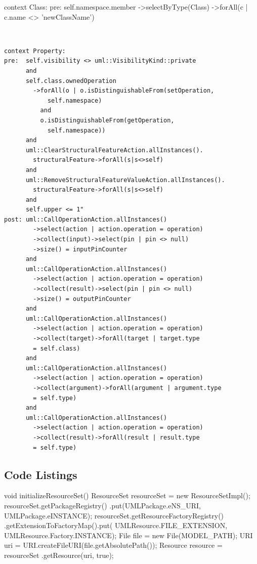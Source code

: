 \documentclass{llncs}
\begin{document}
\begin{lstsingle}[language=OCL,caption=OCL for \textit{rename class} refactoring,label=lst:renameclass]
context Class:
pre:  self.namespace.member
      ->selectByType(Class)
      ->forAll(c | c.name <> 'newClassName')
\end{lstsingle}
\\
\begin{lstlisting}[language=OCL,caption=OCL for \textit{encapsulate property} refactoring,label=lst:encapsulate]
context Property:
pre:  self.visibility <> uml::VisibilityKind::private 
      and 
      self.class.ownedOperation
        ->forAll(o | o.isDistinguishableFrom(setOperation, 
            self.namespace)
          and 
          o.isDistinguishableFrom(getOperation, 
            self.namespace)) 
      and 
      uml::ClearStructuralFeatureAction.allInstances().
        structuralFeature->forAll(s|s<>self)
      and
      uml::RemoveStructuralFeatureValueAction.allInstances().
        structuralFeature->forAll(s|s<>self)
      and
      self.upper <= 1"
post: uml::CallOperationAction.allInstances()
        ->select(action | action.operation = operation)
        ->collect(input)->select(pin | pin <> null)
        ->size() = inputPinCounter
      and
      uml::CallOperationAction.allInstances()
        ->select(action | action.operation = operation)
        ->collect(result)->select(pin | pin <> null)
        ->size() = outputPinCounter
      and
      uml::CallOperationAction.allInstances()
        ->select(action | action.operation = operation)
        ->collect(target)->forAll(target | target.type 
        = self.class)
      and 
      uml::CallOperationAction.allInstances()
        ->select(action | action.operation = operation)
        ->collect(argument)->forAll(argument | argument.type 
        = self.type)
      and
      uml::CallOperationAction.allInstances()
        ->select(action | action.operation = operation)
        ->collect(result)->forAll(result | result.type 
        = self.type)
\end{lstlisting}

\subsection{Code Listings}
\label{sec:applistings}

\begin{lstsingle}[language=Java,caption=Initializing the resourceset,label=lst:resourceset]
void initializeResourceSet() {
  ResourceSet resourceSet = new ResourceSetImpl();
  resourceSet.getPackageRegistry()
    .put(UMLPackage.eNS_URI, UMLPackage.eINSTANCE);
  resourceSet.getResourceFactoryRegistry()
    .getExtensionToFactoryMap().put(
      UMLResource.FILE_EXTENSION, 
      UMLResource.Factory.INSTANCE);
  File file = new File(MODEL_PATH);
  URI uri = URI.createFileURI(file.getAbsolutePath());
  Resource resource = resourceSet
    .getResource(uri, true);
}
\end{lstsingle}
\\
\end{document}

